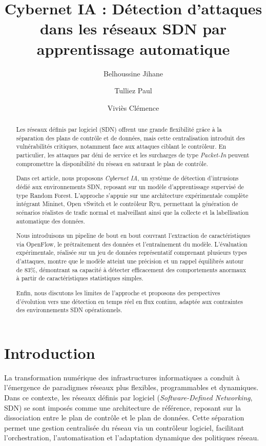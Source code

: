 \documentclass[11pt]{article}
\title{Cybernet IA : Détection d’attaques dans les réseaux SDN par apprentissage automatique }
\author{Belhoussine Jihane \and Tulliez Paul \and Viviès Clémence}
\date{}
\begin{document}
\maketitle


\begin{abstract}
Les réseaux définis par logiciel (SDN) offrent une grande flexibilité grâce à la séparation des plans de contrôle et de données, mais cette centralisation introduit des vulnérabilités critiques, notamment face aux attaques ciblant le contrôleur. En particulier, les attaques par déni de service et les surcharges de type \textit{Packet-In} peuvent compromettre la disponibilité du réseau en saturant le plan de contrôle.

Dans cet article, nous proposons \textit{Cybernet IA}, un système de détection d’intrusions dédié aux environnements SDN, reposant sur un modèle d’apprentissage supervisé de type Random Forest. L’approche s’appuie sur une architecture expérimentale complète intégrant Mininet, Open vSwitch et le contrôleur Ryu, permettant la génération de scénarios réalistes de trafic normal et malveillant ainsi que la collecte et la labellisation automatique des données.

Nous introduisons un pipeline de bout en bout couvrant l’extraction de caractéristiques via OpenFlow, le prétraitement des données et l’entraînement du modèle. L’évaluation expérimentale, réalisée sur un jeu de données représentatif comprenant plusieurs types d’attaques, montre que le modèle atteint une précision et un rappel équilibrés autour de 83\%, démontrant sa capacité à détecter efficacement des comportements anormaux à partir de caractéristiques statistiques simples.

Enfin, nous discutons les limites de l’approche et proposons des perspectives d’évolution vers une détection en temps réel en flux continu, adaptée aux contraintes des environnements SDN opérationnels.
\end{abstract}



\section{Introduction}

La transformation numérique des infrastructures informatiques a conduit à l’émergence de paradigmes réseaux plus flexibles, programmables et dynamiques. Dans ce contexte, les réseaux définis par logiciel (\textit{Software-Defined Networking}, SDN) se sont imposés comme une architecture de référence, reposant sur la dissociation entre le plan de contrôle et le plan de données. Cette séparation permet une gestion centralisée du réseau via un contrôleur logiciel, facilitant l’orchestration, l’automatisation et l’adaptation dynamique des politiques réseau.
\end{document}
